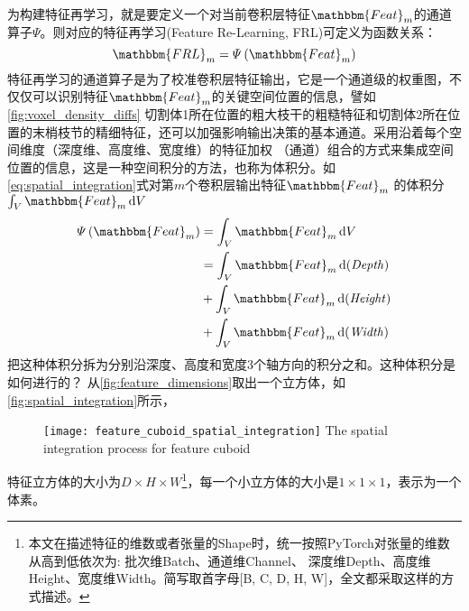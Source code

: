 为构建特征再学习，就是要定义一个对当前卷积层特征$\mathbbm{Feat}_m$的通道算子$\varPsi$。则对应的特征再学习(Feature Re-Learning, FRL)可定义为函数关系：
\begin{equation}
    \mathbbm{FRL}_m = \varPsi\left(\mathbbm{Feat}_m\right)
\end{equation}
特征再学习的通道算子是为了校准卷积层特征输出，它是一个通道级的权重图，不仅仅可以识别特征$\mathbbm{Feat}_m$的关键空间位置的信息，譬如\autoref{fig:voxel_density_diffs}
切割体1所在位置的粗大枝干的粗糙特征和切割体2所在位置的末梢枝节的精细特征，还可以加强影响输出决策的基本通道。采用沿着每个空间维度（深度维、高度维、宽度维）的特征加权
（通道）组合的方式来集成空间位置的信息，这是一种空间积分的方法，也称为体积分。如\ref{eq:spatial_integration}式对第$m$个卷积层输出特征$\mathbbm{Feat}_m$
的体积分$\int_{V}\mathbbm{Feat}_m\dd V$
\begin{equation}\label{eq:spatial_integration}
\begin{split}
    \varPsi\left(\mathbbm{Feat}_m\right) &= \int_{V}\mathbbm{Feat}_m\dd V \\
                                         &= \int_{V}\mathbbm{Feat}_m\dd (\mathit{Depth}) \\
                                         &+ \int_{V}\mathbbm{Feat}_m\dd (\mathit{Height}) \\
                                         &+ \int_{V}\mathbbm{Feat}_m\dd (\mathit{Width})
\end{split}
\end{equation}
把这种体积分拆为分别沿深度、高度和宽度3个轴方向的积分之和。这种体积分是如何进行的？ 从\autoref{fig:feature_dimensions}取出一个立方体，如\autoref{fig:spatial_integration}所示，
\begin{figure}[!htp]
    \centering
    \texttt{[image: feature\_cuboid\_spatial\_integration]}
        {The spatial integration process for feature cuboid}
    \label{fig:spatial_integration}
\end{figure}
特征立方体的大小为$D \times H \times W$\footnote{本文在描述特征的维数或者张量的Shape时，统一按照PyTorch对张量的维数从高到低依次为: 批次维Batch、通道维Channel、
深度维Depth、高度维Height、宽度维Width。简写取首字母[B, C, D, H, W]，全文都采取这样的方式描述。}，每一个小立方体的大小是$1 \times 1 \times 1$，表示为一个体素。


